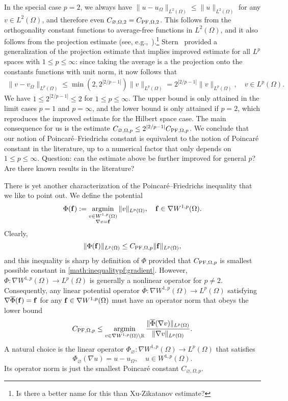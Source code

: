 \documentclass[a4paper]{amsart}
\begin{document}
In the special case $p=2$, we always have $\| u - u_\Omega \|_{L^{2}(\Omega)} \leq \| u \|_{L^{2}(\Omega)}$ for any $v \in L^{2}(\Omega)$,
and therefore even $C_{\varnothing,\Omega,2} = C_{{\rm PF},\Omega,2}$. 
This follows from the orthogonality constant functions to average-free functions in $L^2(\Omega)$,
and it also follows from the projection estimate (see, e.g.,~\cite{xu2003some}).\footnote{\color{red}Is there a better name for this than Xu-Zikatanov estimate?}
Stern~\cite{stern2015banach} provided a generalization of the projection estimate that implies improved estimate for all $L^p$ spaces with $1 \leq p \leq \infty$:
since taking the average is a the projection onto the constants functions with unit norm, it now follows that 
\begin{align*}
    \| v - v_\Omega \|_{L^{p}(\Omega)}
    \leq 
    \min\left( 2, 2^{|2/p-1|} \right)
    \| v \|_{L^{p}(\Omega)}
    = 
    2^{|2/p-1|} 
    \| v \|_{L^{p}(\Omega)}
    ,
    \quad 
    v \in L^p(\Omega)
    .
\end{align*}
We have $1 \leq 2^{|2/p-1|} \leq 2$ for $1 \leq p \leq \infty$.
The upper bound is only attained in the limit cases $p = 1$ and $p = \infty$, and the lower bound is only attained if $p = 2$, which reproduces the improved estimate for the Hilbert space case.
The main consequence for us is the estimate 
$C_{\varnothing,\Omega,p} \leq 2^{|2/p-1|} C_{{\rm PF},\Omega,p}$.
We conclude that our notion of Poincar\'e--Friedrichs constant is equivalent to the notion of Poincar\'e constant in the literature, up to a numerical factor that only depends on $1 \leq p \leq \infty$.
\color{red} Question: can the estimate above be further improved for general $p$? Are there known results in the literature? \color{black}

There is yet another characterization of the Poincar\'e--Friedrichs inequality that we like to point out. 
We define the potential 
\[
    \Phi( {\mathbf f} ) := \operatorname*{{\rm argmin}}\limits_{ \substack{ v \in W^{1,p}(\Omega) \\ \nabla v = {\mathbf f} } } \| v \|_{L^{p}(\Omega)},
    \quad 
    {\mathbf f} \in \nabla W^{1,p}(\Omega)
    .
\]
Clearly, 
\[
    \| \Phi({\mathbf f}) \|_{L^p(\Omega)} \leq C_{{\rm PF},\Omega,p} \| {\mathbf f} \|_{L^p(\Omega)},
\]
and this inequality is sharp by definition of $\Phi$ provided that $C_{{\rm PF},\Omega,p}$ is smallest possible constant in \eqref{math:inequalitypf:gradient}. 
However, $\Phi : \nabla W^{1,p}(\Omega) \rightarrow L^p(\Omega)$ is generally a nonlinear operator for $p \neq 2$. 
Consequently, any linear potential operator $\overline\Phi : \nabla W^{1,p}(\Omega) \rightarrow L^p(\Omega)$
satisfying $\nabla \overline\Phi( {\mathbf f} ) = {\mathbf f}$ for any ${\mathbf f} \in \nabla W^{1,p}(\Omega)$ must have an operator norm that obeys the lower bound 
\[
    C_{{\rm PF},\Omega,p} 
    \leq 
    \operatorname*{{\rm argmin}}\limits_{ v \in \nabla W^{1,p}(\Omega) \setminus {\mathbb R} } 
    \frac{ \| \overline\Phi(\nabla v) \|_{L^p(\Omega)} }{ \| \nabla v \|_{L^p(\Omega)} }
    .
\]
A natural choice is the linear operator $\Phi_{\varnothing} : \nabla W^{1,p}(\Omega) \rightarrow L^p(\Omega)$ that satisfies 
\[
    \Phi_{\varnothing}( \nabla u ) = u - u_{\Omega},
    \quad 
    u \in W^{1,p}(\Omega)
    .
\]
Its operator norm is just the smallest Poincar\'e constant $C_{\varnothing,\Omega,p}$.
\end{document}

